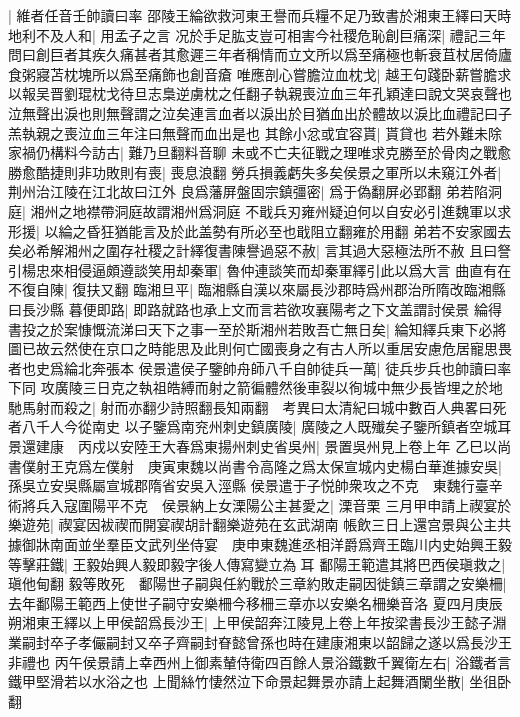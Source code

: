 |{
	維者任音壬帥讀曰率}
邵陵王綸欲救河東王譽而兵糧不足乃致書於湘東王繹曰天時地利不及人和|{
	用孟子之言}
况於手足肱支豈可相害今社稷危恥創巨痛深|{
	禮記三年問曰創巨者其疾久痛甚者其愈遲三年者稱情而立文所以爲至痛極也斬衰苴杖居倚廬食粥寢苫枕塊所以爲至痛飾也創音瘡}
唯應剖心嘗膽泣血枕戈|{
	越王句踐卧薪嘗膽求以報吴晋劉琨枕戈待旦志梟逆虜枕之任翻子執親喪泣血三年孔穎達曰說文哭哀聲也泣無聲出淚也則無聲謂之泣矣連言血者以淚出於目猶血出於體故以淚比血禮記曰子羔執親之喪泣血三年注曰無聲而血出是也}
其餘小忿或宜容貰|{
	貰貸也}
若外難未除家禍仍構料今訪古|{
	難乃旦翻料音聊}
未或不亡夫征戰之理唯求克勝至於骨肉之戰愈勝愈酷捷則非功敗則有喪|{
	喪息浪翻}
勞兵損義虧失多矣侯景之軍所以未窺江外者|{
	荆州治江陵在江北故曰江外}
良爲藩屏盤固宗鎮彊密|{
	爲于偽翻屏必郢翻}
弟若陷洞庭|{
	湘州之地襟帶洞庭故謂湘州爲洞庭}
不戢兵刃雍州疑迫何以自安必引進魏軍以求形援|{
	以綸之昏狂猶能言及於此盖勢有所必至也戢阻立翻雍於用翻}
弟若不安家國去矣必希解湘州之圍存社稷之計繹復書陳譽過惡不赦|{
	言其過大惡極法所不赦}
且曰詧引楊忠來相侵逼頗遵談笑用却秦軍|{
	魯仲連談笑而却秦軍繹引此以爲大言}
曲直有在不復自陳|{
	復扶又翻}
臨湘旦平|{
	臨湘縣自漢以來屬長沙郡時爲州郡治所隋改臨湘縣曰長沙縣}
暮便即路|{
	即路就路也承上文而言若欲攻襄陽考之下文盖謂討侯景}
綸得書投之於案慷慨流涕曰天下之事一至於斯湘州若敗吾亡無日矣|{
	綸知繹兵東下必將圖已故云然使在京口之時能思及此則何亡國喪身之有古人所以重居安慮危居寵思畏者也史爲綸北奔張本}
侯景遣侯子鑒帥舟師八千自帥徒兵一萬|{
	徒兵步兵也帥讀曰率下同}
攻廣陵三日克之執祖皓縛而射之箭徧體然後車裂以徇城中無少長皆埋之於地馳馬射而殺之|{
	射而亦翻少詩照翻長知兩翻　考異曰太清紀曰城中數百人典畧曰死者八千人今從南史}
以子鑒爲南兖州刺史鎮廣陵|{
	廣陵之人既殱矣子鑒所鎮者空城耳}
景還建康　丙戍以安陸王大春爲東揚州刺史省吳州|{
	景置吳州見上卷上年}
乙巳以尚書僕射王克爲左僕射　庚寅東魏以尚書令高隆之爲太保宣城内史楊白華進據安吳|{
	孫吳立安吳縣屬宣城郡隋省安吳入涇縣}
侯景遣于子悦帥衆攻之不克　東魏行臺辛術將兵入寇圍陽平不克　侯景納上女溧陽公主甚愛之|{
	溧音栗}
三月甲申請上禊宴於樂遊苑|{
	禊宴因袚禊而開宴禊胡計翻樂遊苑在玄武湖南}
帳飲三日上還宫景與公主共據御牀南面並坐羣臣文武列坐侍宴　庚申東魏進丞相洋爵爲齊王臨川内史始興王毅等擊莊鐵|{
	王毅始興人毅即毅字後人傳寫變立為耳}
鄱陽王範遣其將巴西侯瑱救之|{
	瑱他甸翻}
毅等敗死　鄱陽世子嗣與任約戰於三章約敗走嗣因徙鎮三章謂之安樂柵|{
	去年鄱陽王範西上使世子嗣守安樂柵今移柵三章亦以安樂名柵樂音洛}
夏四月庚辰朔湘東王繹以上甲侯韶爲長沙王|{
	上甲侯韶奔江陵見上卷上年按梁書長沙王懿子淵業嗣封卒子孝儼嗣封又卒子齊嗣封眘懿曾孫也時在建康湘東以韶歸之遂以爲長沙王非禮也}
丙午侯景請上幸西州上御素輦侍衛四百餘人景浴鐵數千翼衛左右|{
	浴鐵者言鐵甲堅滑若以水浴之也}
上聞絲竹悽然泣下命景起舞景亦請上起舞酒闌坐散|{
	坐徂卧翻}
